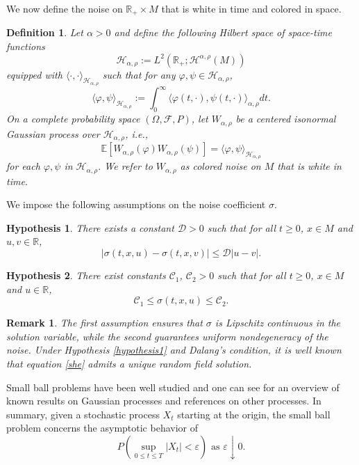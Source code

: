 \documentclass[12pt]{amsart}
\newtheorem{definition}{Definition}[section]
\newtheorem{remark}{Remark}[section]
\newtheorem{hypothesis}{Hypothesis}[section]
\numberwithin{equation}{section}
\newcommand{\R}{\mathbb{R}}
\newcommand{\E}{\mathbb{E}}
\newcommand{\1}{\mathbf{1}}
\begin{document}
We now define the noise on $\R_+\times M$ that is white in time and colored in space.
\begin{definition}
\label{color_noise}
Let $\alpha > 0$ and define the following Hilbert space of space-time functions
\[
\mathcal{H}_{\alpha,\rho} := L^2(\R_+;\mathcal{H^{\alpha,\rho}}(M))
\]
equipped with $\langle\cdot,\cdot\rangle_{\mathcal{H}_{\alpha,\rho}}$ such that for any $\varphi,\psi\in\mathcal{H}_{\alpha,\rho}$,
\[
\langle\varphi,\psi\rangle_{\mathcal{H}_{\alpha,\rho}}:=\int_{0}^\infty\langle\varphi(t,\cdot), \psi(t,\cdot)\rangle_{\alpha,\rho}dt.
\]
On a complete probability space $(\Omega, \mathcal{F},P)$, let $W_{\alpha,\rho}$ be a centered isonormal Gaussian process over $\mathcal{H}_{\alpha,\rho}$, i.e.,
\[
\E[W_{\alpha,\rho}(\varphi)W_{\alpha,\rho}(\psi)]=\langle\varphi,\psi\rangle_{\mathcal{H}_{\alpha,\rho}}
\]
for each $\varphi,\psi$ in $\mathcal{H}_{\alpha,\rho}$. We refer to $W_{\alpha,\rho}$ as colored noise on $M$ that is white in time.
\end{definition}

We impose the following assumptions on the noise coefficient $\sigma$.
\begin{hypothesis}
There exists a constant $\mathcal{D}>0$ such that for all $t\geq 0$, $x\in M$ and $u,v\in\R$,
\begin{equation}
\label{hypothesis1}
\vert \sigma(t,x,u)-\sigma(t,x,v)\vert\leq\mathcal{D}|u-v|.
\end{equation}
\end{hypothesis}
\begin{hypothesis}
There exist constants $\mathcal{C}_1$, $\mathcal{C}_2>0$ such that for all $t\geq 0$, $x\in M$ and $u\in\R$,
\begin{equation}
\label{hypothesis2}
\mathcal{C}_1\leq \sigma(t,x,u)\leq \mathcal{C}_2.
\end{equation}
\end{hypothesis}

\begin{remark}
    The first assumption ensures that $\sigma$ is Lipschitz continuous in the solution variable, while the second guarantees uniform nondegeneracy of the noise. Under Hypothesis \eqref{hypothesis1} and Dalang’s condition, it is well known that equation \eqref{she} admits a unique random field solution.
\end{remark}

Small ball problems have been well studied and one can see \cite{li2001gaussian} for an overview of known results on Gaussian processes and references on other processes. In summary, given a stochastic process $X_t$ starting at the origin, the small ball problem concerns the asymptotic behavior of
\[P\left(\sup_{0\leq t\leq T}\vert X_t\vert<\varepsilon\right)
\text{ as } \varepsilon\downarrow 0.\]
\end{document}
